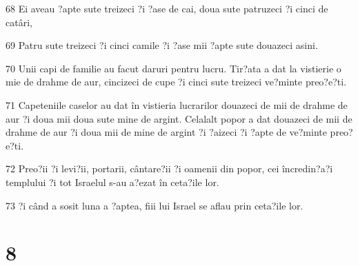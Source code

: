\par 68 Ei aveau ?apte sute treizeci ?i ?ase de cai, doua sute patruzeci ?i cinci de catâri,
\par 69 Patru sute treizeci ?i cinci camile ?i ?ase mii ?apte sute douazeci asini.
\par 70 Unii capi de familie au facut daruri pentru lucru. Tir?ata a dat la vistierie o mie de drahme de aur, cincizeci de cupe ?i cinci sute treizeci ve?minte preo?e?ti.
\par 71 Capeteniile caselor au dat în vistieria lucrarilor douazeci de mii de drahme de aur ?i doua mii doua sute mine de argint. Celalalt popor a dat douazeci de mii de drahme de aur ?i doua mii de mine de argint ?i ?aizeci ?i ?apte de ve?minte preo?e?ti.
\par 72 Preo?ii ?i levi?ii, portarii, cântare?ii ?i oamenii din popor, cei încredin?a?i templului ?i tot Israelul s-au a?ezat în ceta?ile lor.
\par 73 ?i când a sosit luna a ?aptea, fiii lui Israel se aflau prin ceta?ile lor.

\chapter{8}

